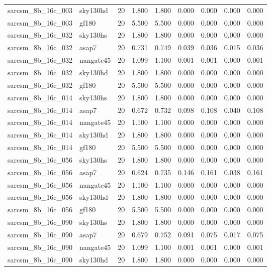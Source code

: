 \begin{tabular}{llrrrrrrr}
sarcsm\_8b\_16c\_003 & sky130hd & 20 & 1.800 & 1.800 & 0.000 & 0.000 & 0.000 & 0.000 \\
sarcsm\_8b\_16c\_003 & gf180 & 20 & 5.500 & 5.500 & 0.000 & 0.000 & 0.000 & 0.000 \\
sarcsm\_8b\_16c\_032 & sky130hs & 20 & 1.800 & 1.800 & 0.000 & 0.000 & 0.000 & 0.000 \\
sarcsm\_8b\_16c\_032 & asap7 & 20 & 0.731 & 0.749 & 0.039 & 0.036 & 0.015 & 0.036 \\
sarcsm\_8b\_16c\_032 & nangate45 & 20 & 1.099 & 1.100 & 0.001 & 0.001 & 0.000 & 0.001 \\
sarcsm\_8b\_16c\_032 & sky130hd & 20 & 1.800 & 1.800 & 0.000 & 0.000 & 0.000 & 0.000 \\
sarcsm\_8b\_16c\_032 & gf180 & 20 & 5.500 & 5.500 & 0.000 & 0.000 & 0.000 & 0.000 \\
sarcsm\_8b\_16c\_014 & sky130hs & 20 & 1.800 & 1.800 & 0.000 & 0.000 & 0.000 & 0.000 \\
sarcsm\_8b\_16c\_014 & asap7 & 20 & 0.672 & 0.732 & 0.098 & 0.108 & 0.040 & 0.108 \\
sarcsm\_8b\_16c\_014 & nangate45 & 20 & 1.100 & 1.100 & 0.000 & 0.000 & 0.000 & 0.000 \\
sarcsm\_8b\_16c\_014 & sky130hd & 20 & 1.800 & 1.800 & 0.000 & 0.000 & 0.000 & 0.000 \\
sarcsm\_8b\_16c\_014 & gf180 & 20 & 5.500 & 5.500 & 0.000 & 0.000 & 0.000 & 0.000 \\
sarcsm\_8b\_16c\_056 & sky130hs & 20 & 1.800 & 1.800 & 0.000 & 0.000 & 0.000 & 0.000 \\
sarcsm\_8b\_16c\_056 & asap7 & 20 & 0.624 & 0.735 & 0.146 & 0.161 & 0.038 & 0.161 \\
sarcsm\_8b\_16c\_056 & nangate45 & 20 & 1.100 & 1.100 & 0.000 & 0.000 & 0.000 & 0.000 \\
sarcsm\_8b\_16c\_056 & sky130hd & 20 & 1.800 & 1.800 & 0.000 & 0.000 & 0.000 & 0.000 \\
sarcsm\_8b\_16c\_056 & gf180 & 20 & 5.500 & 5.500 & 0.000 & 0.000 & 0.000 & 0.000 \\
sarcsm\_8b\_16c\_090 & sky130hs & 20 & 1.800 & 1.800 & 0.000 & 0.000 & 0.000 & 0.000 \\
sarcsm\_8b\_16c\_090 & asap7 & 20 & 0.679 & 0.752 & 0.091 & 0.075 & 0.017 & 0.075 \\
sarcsm\_8b\_16c\_090 & nangate45 & 20 & 1.099 & 1.100 & 0.001 & 0.001 & 0.000 & 0.001 \\
sarcsm\_8b\_16c\_090 & sky130hd & 20 & 1.800 & 1.800 & 0.000 & 0.000 & 0.000 & 0.000 \\

\end{tabular}
